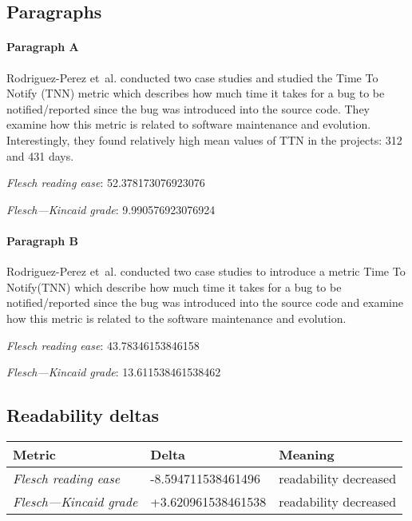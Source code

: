 \subsection{Paragraphs}
\paragraph{Paragraph A}
Rodriguez-Perez et al. conducted two case studies and studied the Time To Notify (TNN) metric which describes how much time it takes for a bug to be notified/reported since the bug was introduced into the source code. They examine how this metric is related to software maintenance and evolution. Interestingly, they found relatively high mean values of TTN in the projects: 312 and 431 days.\par\medskip\emph{Flesch reading ease}: 52.378173076923076\par\emph{Flesch---Kincaid grade}: 9.990576923076924

\paragraph{Paragraph B}
Rodriguez-Perez et al. conducted two case studies to introduce a metric Time To Notify(TNN) which describe how much time it takes for a bug to be notified/reported since the bug was introduced into the source code and examine how this metric is related to the software maintenance and evolution.\par\medskip\emph{Flesch reading ease}: 43.78346153846158\par\emph{Flesch---Kincaid grade}: 13.611538461538462

\subsection{Readability deltas}

\begin{tabular}{lll}
\toprule
               \textbf{Metric} &      \textbf{Delta} &       \textbf{Meaning} \\
\midrule
    \emph{Flesch reading ease} &  -8.594711538461496 &  readability decreased \\
 \emph{Flesch---Kincaid grade} &  +3.620961538461538 &  readability decreased \\
\bottomrule
\end{tabular}

